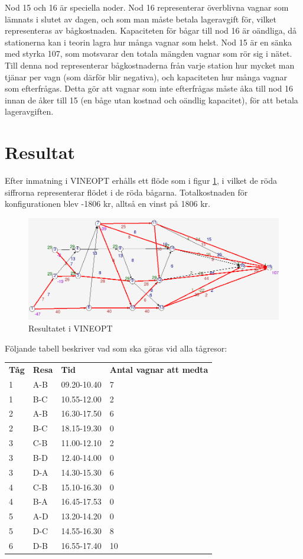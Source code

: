 \documentclass[a4paper,titlepage,12pt]{article}
\begin{document}
Nod 15 och 16 är speciella noder. Nod 16 representerar överblivna vagnar som
lämnats i slutet av dagen, och som man måste betala lageravgift för, vilket
representeras av bågkostnaden. Kapaciteten för bågar till nod 16 är oändliga,
då stationerna kan i teorin lagra hur många vagnar som helst. Nod 15 är en
sänka med styrka 107, som motsvarar den totala mängden vagnar som rör sig i
nätet.  Till denna nod representerar bågkostnaderna från varje station hur mycket man
tjänar per vagn (som därför blir negativa), och kapaciteten hur många vagnar
som efterfrågas. Detta gör att vagnar som inte efterfrågas måste åka till nod
16 innan de åker till 15 (en båge utan kostnad och oändlig kapacitet), 
för att betala lageravgiften.

\section*{Resultat}
Efter inmatning i VINEOPT erhålls ett flöde som i figur \ref{resfig}, i vilket
de röda siffrorna representerar flödet i de röda bågarna. Totalkostnaden för
konfigurationen blev -1806 kr, alltså en vinst på 1806 kr.

\begin{figure}[h]
    \begin{centering}
        \includegraphics[width=15cm]{res.png}
        \caption{Resultatet i VINEOPT\label{resfig}}
    \end{centering}
\end{figure}

Följande tabell beskriver vad som ska göras vid alla tågresor:

\begin{tabular}{l l l l} 
    \textbf{Tåg} & \textbf{Resa} & \textbf{Tid} & \textbf{Antal vagnar att
    medta}  \\
    1 & A-B & 09.20-10.40 & 7 \\
    1 & B-C & 10.55-12.00 & 2 \\
    2 & A-B & 16.30-17.50 & 6 \\
    2 & B-C & 18.15-19.30 & 0 \\
    3 & C-B & 11.00-12.10 & 2 \\
    3 & B-D & 12.40-14.00 & 0 \\
    3 & D-A & 14.30-15.30 & 6 \\
    4 & C-B & 15.10-16.30 & 0 \\
    4 & B-A & 16.45-17.53 & 0 \\
    5 & A-D & 13.20-14.20 & 0 \\
    5 & D-C & 14.55-16.30 & 8 \\
    6 & D-B & 16.55-17.40 & 10 \\
\end{tabular}
\end{document}
